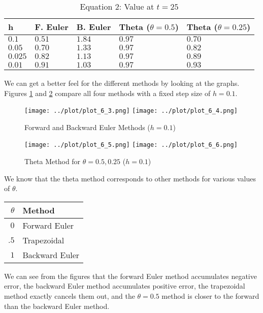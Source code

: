\begin{solution}
\begin{enumerate}
    \begin{table}[!ht]
      \label{tab:eq2_values}
      \centering
      \caption{Equation 2: Value at $t = 25$}
      \begin{tabular}{|l|l|l|l|l|}
        \hline
        h & F. Euler & B. Euler & Theta ($\theta = 0.5$) & Theta ($\theta =0.25$) \\
        \hline
        $0.1$   & $0.51$ & $1.84$ & $0.97$ & $0.70$ \\
        $0.05$  & $0.70$ & $1.33$ & $0.97$ & $0.82$ \\
        $0.025$ & $0.82$ & $1.13$ & $0.97$ & $0.89$ \\
        $0.01$  & $0.91$ & $1.03$ & $0.97$ & $0.93$ \\
        \hline
      \end{tabular}
    \end{table}
    
    We can get a better feel for the different methods by looking at the graphs. Figures \ref{fig:eq2_fb} and \ref{fig:eq2_t} compare all four methods with a fixed step size of $h = 0.1$.
    
    \begin{figure}[!ht]
      \centering
      \texttt{[image: ../plot/plot\_6\_3.png]}
      \texttt{[image: ../plot/plot\_6\_4.png]}
      \caption{Forward and Backward Euler Methods ($h = 0.1$)}
      \label{fig:eq2_fb}
    \end{figure}
    
    \begin{figure}[!ht]
      \centering
      \texttt{[image: ../plot/plot\_6\_5.png]}
      \texttt{[image: ../plot/plot\_6\_6.png]}
      \caption{Theta Method for $\theta = 0.5, 0.25$ ($h = 0.1$)}
      \label{fig:eq2_t}
    \end{figure}
    
    \FloatBarrier
    We know that the theta method corresponds to other methods for various values of $\theta$. 
    
    \begin{table}[!ht]
      \centering
      \begin{tabular}{|rl|}
        \hline
        $\theta$ & Method \\
        \hline
        $0$ & Forward Euler \\
        $.5$ & Trapezoidal \\
        $1$ & Backward Euler \\
        \hline
      \end{tabular}
    \end{table}
    
    We can see from the figures that the forward Euler method accumulates negative error, the backward Euler method accumulates positive error, the trapezoidal method exactly cancels them out, and the $\theta = 0.5$ method is closer to the forward than the backward Euler method.
  \end{enumerate}
\end{solution}